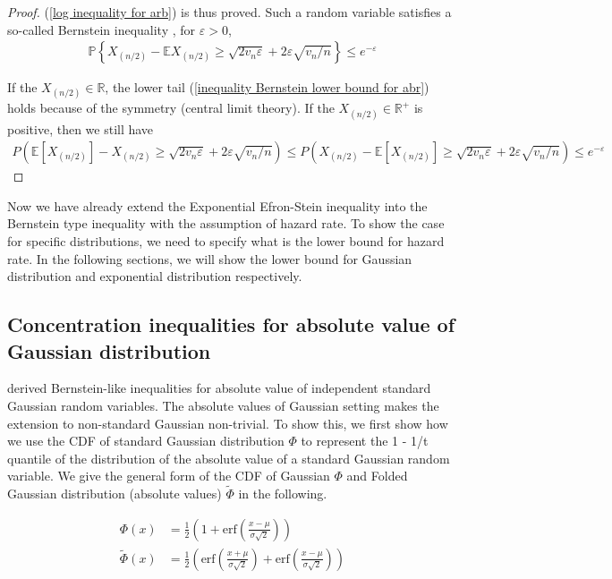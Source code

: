 \documentclass{article}
\theoremstyle{plain}
\begin{document}
\begin{proof}
(\ref{log inequality for arb}) is thus proved. Such a random variable satisfies a so-called Bernstein inequality \cite{boucheron2013}, for $\varepsilon > 0$, 
\begin{align}
    \mathbb{P}\left\{X_{(n / 2)}-\mathbb{E} X_{(n / 2)} \geq \sqrt{2 v_{n} \varepsilon}+2 \varepsilon \sqrt{v_{n} / n}\right\} \leq e^{-\varepsilon}
\end{align}

If the $X_{(n/2)} \in \mathbb{R}$, the lower tail (\ref{inequality Bernstein lower bound for abr}) holds because of the symmetry (central limit theory). If the $X_{(n/2)} \in \mathbb{R^+}$ is positive, then we still have 
\begin{align}
    P\left( \mathbb{E}[ X_{(n/2)}] - X_{(n/2)} \geq \sqrt{2v_n \varepsilon} + 2 \varepsilon \sqrt{v_n/n} \right) \leq P\left( X_{(n/2)}-\mathbb{E}[ X_{(n/2)}] \geq \sqrt{2v_n \varepsilon} + 2 \varepsilon \sqrt{v_n/n} \right) \leq e^{-\varepsilon}
\end{align}
\end{proof}

Now we have already extend the Exponential Efron-Stein inequality \cite{boucheron2012} into the Bernstein type inequality with the assumption of hazard rate. To show the case for specific distributions, we need to specify what is the lower bound for hazard rate. In the following sections, we will show the lower bound for Gaussian distribution and exponential distribution respectively.  

\subsection{Concentration inequalities for absolute value of Gaussian distribution}

\cite{boucheron2012} derived Bernstein-like inequalities for absolute value of independent standard Gaussian random variables. The absolute values of Gaussian setting makes the extension to non-standard Gaussian non-trivial. To show this, we first show how we use the CDF of standard Gaussian distribution $\Phi$ to represent the 1 - 1/t quantile of the distribution of the absolute value of a standard Gaussian random variable. We give the general form of the CDF of Gaussian $\Phi$ and Folded Gaussian distribution (absolute values) $\tilde{\Phi}$ in the following.

\begin{align}
    \Phi(x) &= \frac{1}{2}\left(1 + \text{erf}(\frac{x - \mu}{\sigma \sqrt{2}})\right)\\
    \tilde{\Phi}(x) &= \frac{1}{2}\left(\text{erf}(\frac{x + \mu}{\sigma \sqrt{2}}) + \text{erf}(\frac{x - \mu}{\sigma \sqrt{2}})\right) 
\end{align}
\end{document}
